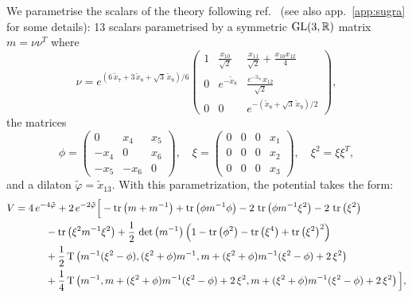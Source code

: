 \documentclass[11pt,a4paper]{article}
\begin{document}
We parametrise the scalars of the theory following ref.~\cite{Eloy:2021fhc} (see also app.~\ref{app:sugra} for some details): 13 scalars parametrised by a symmetric ${\rm GL}(3,\mathbb{R})$ matrix $m = \nu\nu^{T}$ where
\begin{equation} \label{eq:13scalars1}
	\nu = e^{(6\,\tilde{x}_{7}+3\,\tilde{x}_{8}+\sqrt{3}\,\tilde{x}_{9})/6}
				\begin{pmatrix}
					1 & \frac{x_{10}}{\sqrt{2}} & \frac{x_{11}}{\sqrt{2}} + \frac{x_{10}x_{12}}{4} \\
					0 & e^{-\tilde{x}_{8}} & \frac{e^{-\tilde{x}_{8}}\,x_{12}}{\sqrt{2}} \\
					0 & 0 & e^{-(\tilde{x}_{8}+\sqrt{3}\,\tilde{x}_{9})/2}
				\end{pmatrix},
\end{equation}
the matrices 
\begin{equation} \label{eq:13scalars2}
	\phi = 	\begin{pmatrix}
					0 & x_{4} & x_{5} \\
					-x_{4} & 0 & x_{6} \\
					-x_{5} & -x_{6} & 0
				\end{pmatrix}, \quad
	\xi = \begin{pmatrix}
				0 & 0 & 0 & x_{1} \\
				0 & 0 & 0 & x_{2} \\
				0 & 0 & 0 & x_{3}
			\end{pmatrix}, \quad
	\xi^{2} = \xi \xi^{T},
\end{equation}
and a dilaton $\tilde{\varphi} = \tilde{x}_{13}$. With this parametrization, the potential takes the form:
\begin{equation} \label{eq:scalarpotential}
	\begin{aligned}
		V & = 4\,e^{-4\tilde\varphi}+2\,e^{-2\tilde\varphi}\Big[-\tr\left(m+m^{-1}\right)+\tr\left(\phi m^{-1}\phi\right) -2\,\tr\left(\phi m^{-1}\xi^{2}\right)-2\,\tr\left(\xi^{2}\right)\\
		&\qquad\quad-\tr\left(\xi^{2}m^{-1}\xi^{2}\right)  +\frac{1}{2}\,\det\left(m^{-1}\right)\left(1-\tr\left(\phi^{2}\right)-\tr\left(\xi^{4}\right)+\tr\left(\xi^{2}\right)^{2}\right) \\
		&\qquad\quad +\frac{1}{2}\,{\rm T}\left(m^{-1}(\xi^{2}-\phi),(\xi^{2}+\phi)m^{-1},m+(\xi^{2}+\phi)m^{-1}(\xi^{2}-\phi)+2\,\xi^{2}\right)\\
		&\qquad\quad +\frac{1}{4}\,{\rm T}\left(m^{-1},m+(\xi^{2}+\phi)m^{-1}(\xi^{2}-\phi)+2\,\xi^{2},m+(\xi^{2}+\phi)m^{-1}(\xi^{2}-\phi)+2\,\xi^{2}\right)\Big],
	\end{aligned}
\end{equation}
\end{document}
